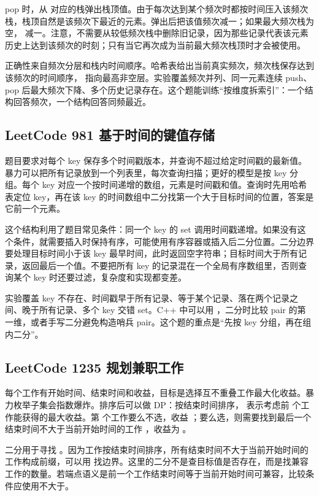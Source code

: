 pop 时，从  对应的栈弹出栈顶值。由于每次达到某个频次时都按时间压入该频次栈，栈顶自然是该频次下最近的元素。弹出后把该值频次减一；如果最大频次栈为空， 减一。注意，不需要从较低频次栈中删除旧记录，因为那些记录代表该元素历史上达到该频次的时刻；只有当它再次成为当前最大频次栈顶时才会被使用。

正确性来自频次分层和栈内时间顺序。哈希表给出当前真实频次，频次栈保存达到该频次的时间顺序， 指向最高非空层。实验覆盖频次并列、同一元素连续 push、pop 后最大频次下降、多个历史记录存在。这个题能训练“按维度拆索引”：一个结构回答频次，一个结构回答同频最近。

\subsection{LeetCode 981 基于时间的键值存储}

题目要求对每个 key 保存多个时间戳版本，并查询不超过给定时间戳的最新值。暴力可以把所有记录放到一个列表里，每次查询扫描；更好的模型是按 key 分组。每个 key 对应一个按时间递增的数组，元素是时间戳和值。查询时先用哈希表定位 key，再在该 key 的时间数组中二分找第一个大于目标时间的位置，答案是它前一个元素。

这个结构利用了题目常见条件：同一个 key 的 set 调用时间戳递增。如果没有这个条件，就需要插入时保持有序，可能使用有序容器或插入后二分位置。二分边界要处理目标时间小于该 key 最早时间，此时返回空字符串；目标时间大于所有记录，返回最后一个值。不要把所有 key 的记录混在一个全局有序数组里，否则查询某个 key 时还要过滤，复杂度和实现都变差。

实验覆盖 key 不存在、时间戳早于所有记录、等于某个记录、落在两个记录之间、晚于所有记录、多个 key 交错 set。C++ 中可以用 ，二分时比较 pair 的第一维，或者手写二分避免构造哨兵 pair。这个题的重点是“先按 key 分组，再在组内二分”。

\subsection{LeetCode 1235 规划兼职工作}

每个工作有开始时间、结束时间和收益，目标是选择互不重叠工作最大化收益。暴力枚举子集会指数爆炸。排序后可以做 DP：按结束时间排序， 表示考虑前  个工作能获得的最大收益。第  个工作要么不选，收益 ；要么选，则需要找到最后一个结束时间不大于当前开始时间的工作 ，收益为 。

二分用于寻找 。因为工作按结束时间排序，所有结束时间不大于当前开始时间的工作构成前缀，可以用  找边界。这里的二分不是查目标值是否存在，而是找兼容工作的数量。若端点语义是前一个工作结束时间等于当前开始时间可兼容，比较条件应使用不大于。

